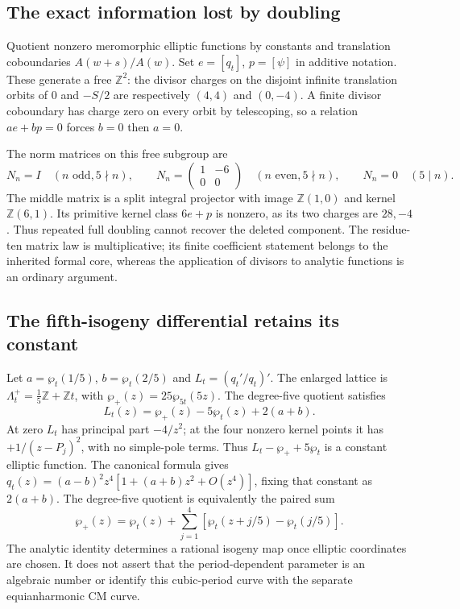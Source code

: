 \subsection{The exact information lost by doubling}
Quotient nonzero meromorphic elliptic functions by constants and translation coboundaries $A(w+s)/A(w)$. Set $e=[q_t]$, $p=[\psi]$ in additive notation. These generate a free $\mathbb Z^2$: the divisor charges on the disjoint infinite translation orbits of $0$ and $-S/2$ are respectively $(4,4)$ and $(0,-4)$. A finite divisor coboundary has charge zero on every orbit by telescoping, so a relation $ae+bp=0$ forces $b=0$ then $a=0$.

The norm matrices on this free subgroup are
\[
 N_n=I\quad(n\text{ odd},5\nmid n),\qquad
 N_n=\begin{pmatrix}1&-6\\0&0\end{pmatrix}\quad(n\text{ even},5\nmid n),\qquad
 N_n=0\quad(5\mid n).
\]
The middle matrix is a split integral projector with image $\mathbb Z(1,0)$ and kernel $\mathbb Z(6,1)$. Its primitive kernel class $6e+p$ is nonzero, as its two charges are $28,-4$. Thus repeated full doubling cannot recover the deleted component. The residue-ten matrix law is multiplicative; its finite coefficient statement belongs to the inherited formal core, whereas the application of divisors to analytic functions is an ordinary argument.

\subsection{The fifth-isogeny differential retains its constant}
Let $a=\wp_t(1/5)$, $b=\wp_t(2/5)$ and $L_t=(q_t'/q_t)'$. The enlarged lattice is $\Lambda_t^+=\tfrac15\mathbb Z+\mathbb Zt$, with $\wp_+(z)=25\wp_{5t}(5z)$. The degree-five quotient satisfies
\begin{equation}\label{eq:isogeny-differential}
 L_t(z)=\wp_+(z)-5\wp_t(z)+2(a+b).
\end{equation}
At zero $L_t$ has principal part $-4/z^2$; at the four nonzero kernel points it has $+1/(z-P_j)^2$, with no simple-pole terms. Thus $L_t-\wp_++5\wp_t$ is a constant elliptic function. The canonical formula gives $q_t(z)=(a-b)^2z^4[1+(a+b)z^2+O(z^4)]$, fixing that constant as $2(a+b)$. The degree-five quotient is equivalently the paired sum
\[
 \wp_+(z)=\wp_t(z)+\sum_{j=1}^{4}[\wp_t(z+j/5)-\wp_t(j/5)].
\]
The analytic identity determines a rational isogeny map once elliptic coordinates are chosen. It does not assert that the period-dependent parameter is an algebraic number or identify this cubic-period curve with the separate equianharmonic CM curve.
